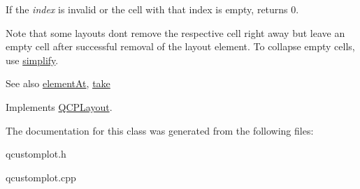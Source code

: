 If the {\itshape index} is invalid or the cell with that index is empty, returns 0.

Note that some layouts don\textquotesingle{}t remove the respective cell right away but leave an empty cell after successful removal of the layout element. To collapse empty cells, use \hyperlink{classQCPLayoutInset_a18b7d508f0baa60cc5dcb1343cf7f32a}{simplify}.

\begin{DoxySeeAlso}{See also}
\hyperlink{classQCPLayoutInset_a881ca205605bae9c034733b808f93a02}{element\+At}, \hyperlink{classQCPLayoutInset_af7f13cc369f8190b5e7e17d5f39dfe1c}{take} 
\end{DoxySeeAlso}


Implements \hyperlink{classQCPLayout_a5a79621fa0a6eabb8b520cfc04fb601a}{Q\+C\+P\+Layout}.



The documentation for this class was generated from the following files\+:\begin{DoxyCompactItemize}
\item 
qcustomplot.\+h\item 
qcustomplot.\+cpp\end{DoxyCompactItemize}

